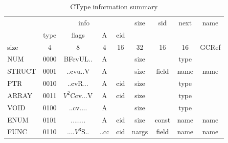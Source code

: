 \begin{table}[H]
\footnotesize
\centering
\caption{CType information summary}
\label{tab:ffi-ctype}
\begin{tabular}{l|c|c|c|c|c|l|c|c|c|c|}
\cline{2-11}
                               & \multicolumn{6}{c|}{info}                                                         & \multirow{2}{*}{size} & \multirow{2}{*}{sid} & \multirow{2}{*}{next} & \multirow{2}{*}{name} \\ \cline{2-7}
                               & type & \multicolumn{2}{c|}{flags}          & A         & \multicolumn{2}{c|}{cid} &                       &                      &                       &                       \\ \hline
\multicolumn{1}{|l|}{size}     & 4    & \multicolumn{2}{c|}{8}              & 4         & \multicolumn{2}{c|}{16}  & 32                    & 16                   & 16                    & GCRef                 \\ \hline
\multicolumn{1}{|l|}{NUM}      & 0000 & \multicolumn{2}{c|}{BFcvUL..}       & A         & \multicolumn{2}{c|}{}    & size                  &                      & type                  &                       \\
\multicolumn{1}{|l|}{STRUCT}   & 0001 & \multicolumn{2}{c|}{..cvu..V}       & A         & \multicolumn{2}{c|}{}    & size                  & field                & name                  & name                  \\
\multicolumn{1}{|l|}{PTR}      & 0010 & \multicolumn{2}{c|}{..cvR...}       & A         & \multicolumn{2}{c|}{cid} & size                  &                      & type                  &                       \\
\multicolumn{1}{|l|}{ARRAY}    & 0011 & \multicolumn{2}{c|}{$V^2$Ccv...V}   & A         & \multicolumn{2}{c|}{cid} & size                  &                      & type                  &                       \\
\multicolumn{1}{|l|}{VOID}     & 0100 & \multicolumn{2}{c|}{..cv....}       & A         & \multicolumn{2}{c|}{}    & size                  &                      & type                  &                       \\
\multicolumn{1}{|l|}{ENUM}     & 0101 & \multicolumn{2}{c|}{........}       & A         & \multicolumn{2}{c|}{cid} & size                  & const                & name                  & name                  \\
\multicolumn{1}{|l|}{FUNC}     & 0110 & \multicolumn{2}{c|}{....$V^3$S..}   & ..cc      & \multicolumn{2}{c|}{cid} & nargs                 & field                & name                  & name                  \\

\end{tabular}
\end{table}
